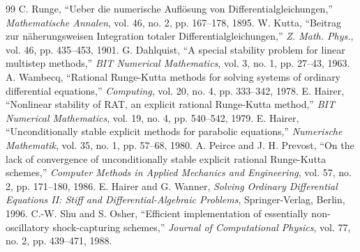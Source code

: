 \documentclass[11pt,a4paper]{article}
\theoremstyle{definition}
\begin{document}

\begin{thebibliography}{99}
 C. Runge, ``Ueber die numerische Aufl{\"o}sung von Differentialgleichungen,'' \textit{Mathematische Annalen}, vol. 46, no. 2, pp. 167--178, 1895.
 W. Kutta, ``Beitrag zur n{\"a}herungsweisen Integration totaler Differentialgleichungen,'' \textit{Z. Math. Phys.}, vol. 46, pp. 435--453, 1901.
 G. Dahlquist, ``A special stability problem for linear multistep methods,'' \textit{BIT Numerical Mathematics}, vol. 3, no. 1, pp. 27--43, 1963.
 A. Wambecq, ``Rational Runge-Kutta methods for solving systems of ordinary differential equations,'' \textit{Computing}, vol. 20, no. 4, pp. 333--342, 1978.
 E. Hairer, ``Nonlinear stability of RAT, an explicit rational Runge-Kutta method,'' \textit{BIT Numerical Mathematics}, vol. 19, no. 4, pp. 540--542, 1979.
 E. Hairer, ``Unconditionally stable explicit methods for parabolic equations,'' \textit{Numerische Mathematik}, vol. 35, no. 1, pp. 57--68, 1980.
 A. Peirce and J. H. Prevost, ``On the lack of convergence of unconditionally stable explicit rational Runge-Kutta schemes,'' \textit{Computer Methods in Applied Mechanics and Engineering}, vol. 57, no. 2, pp. 171--180, 1986.
 E. Hairer and G. Wanner, \textit{Solving Ordinary Differential Equations II: Stiff and Differential-Algebraic Problems}, Springer-Verlag, Berlin, 1996.
 C.-W. Shu and S. Osher, ``Efficient implementation of essentially non-oscillatory shock-capturing schemes,'' \textit{Journal of Computational Physics}, vol. 77, no. 2, pp. 439--471, 1988.
\end{thebibliography}
\end{document}
